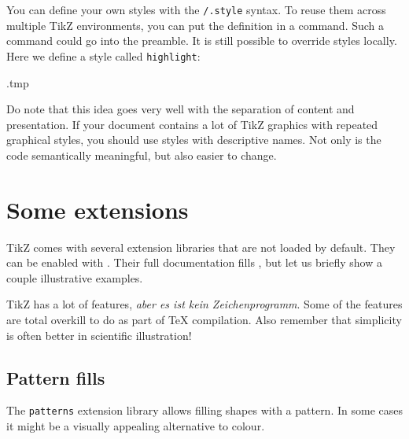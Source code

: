You can define your own styles with the \verb|/.style| syntax.
To reuse them across multiple TikZ environments,
you can put the definition in a  command.
Such a command could go into the preamble.
It is still possible to override styles locally.
Here we define a style called \verb|highlight|:
%
\begin{VerbatimOut}{\jobname.tmp}
\centering
{}
\newcommand{\dogfile}{pictures/TheDogs.jpg}

\end{VerbatimOut}
\ShowExampleBelow[2]


\begin{practices}
Do note that this idea goes very well with the separation of content and presentation.
If your document contains a lot of TikZ graphics with repeated graphical styles,
you should use styles with descriptive names.
Not only is the code semantically meaningful, but also easier to change.
\end{practices}


%
%
\section{Some extensions}

TikZ comes with several extension libraries that are not loaded by default.
They can be enabled with .
Their full documentation fills \cite[Section~V]{tikz},
but let us briefly show a couple illustrative examples.

\begin{practices}
TikZ has a lot of features,
\emph{aber es ist kein Zeichenprogramm}.
Some of the features are total overkill to do as part of \TeX{} compilation.
Also remember that simplicity is often better in scientific illustration!
\end{practices}


%
\subsection{Pattern fills}

The \verb|patterns| extension library allows filling shapes with a pattern.
In some cases it might be a visually appealing alternative to colour.

